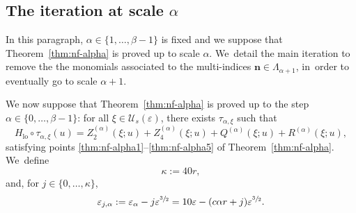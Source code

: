 \documentclass[JEP,XML,SOM,Unicode,published]{cedram}
\theoremstyle{plain}
\theoremstyle{definition}
\DeclareMathOperator{\lo}{lo}
\newcommand{\nb}{{\boldsymbol n}}
\newcommand{\1}{\mathbf{1}}
\let\epsilon\varepsilon
\begin{document}
\subsection{The iteration at scale $\alpha$}\label{sec:it-j} In this paragraph, $\alpha\in\{1,\dots,\beta-1\}$ is fixed and we suppose that Theorem~\ref{thm:nf-alpha} is proved up to scale $\alpha$. We~detail the main iteration to remove the the monomials associated to the multi-indices $\nb\in\Lambda_{\alpha+1}$, in~order to eventually go to scale $\alpha+1$.

We now suppose that Theorem~\ref{thm:nf-alpha} is proved up to the step $\alpha\in\{0,\dots,\beta-1\}$: for all $\xi\in\mathcal{U}_{s}(\epsilon)$, there exists $\tau_{\alpha,\xi}$ such that\vspace*{-3pt}
\begin{equation}
\label{eq:19h}
H_{\lo}\circ\tau_{\alpha,\xi}(u) = Z_{2}^{(\alpha)}(\xi;u) + Z_{4}^{(\alpha)}(\xi;u)+Q^{(\alpha)}(\xi;u) + R^{(\alpha)}(\xi;u),
\end{equation}
satisfying points \eqref{thm:nf-alpha1}--\eqref{thm:nf-alpha5} of Theorem~\ref{thm:nf-alpha}. We~define\vspace*{-3pt}
\[
\kappa:=40r,
\]
and, for $j\in\{0,\dots,\kappa\}$,\vspace*{-3pt}
\[
\epsilon_{j,\alpha}:=\epsilon_{\alpha}-j\epsilon^{\sfrac{3}{2}} = 10\epsilon - (c\alpha r +j)\epsilon^{\sfrac{3}{2}}.
\]
\end{document}
